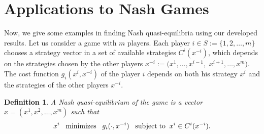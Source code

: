 \documentclass[11pt]{article}
\def\beq{\begin{equation}}
\def\eeq{\end{equation}}
\theoremstyle{plain}
\newtheorem{definition}{Definition}
\newtheorem{remark}{Remark}
\begin{document}
{%

\section{Applications to Nash Games} \label{sec5}
Now, we give some examples in finding Nash {{quasi-equilibria}} using our developed results.
 Let us consider a game with $m$ players. {{Each player $i\in S:=\{1,2,\ldots,m\}$ chooses a strategy vector in a set of available strategies $C^i(x^{-i})$, which depends on the strategies chosen by the other players $x^{-i}:=(x^1,\ldots,x^{i-1},$ $x^{i+1},\ldots,x^m )$.}} 
  The cost function $g_i(x^i,x^{-i})$ of {the} player $i$ depends   on both his strategy $x^i$ and the strategies of {the} other players $x^{-i}$.
\begin{definition}
A  Nash {{quasi-equilibrium}} of the game is a vector $x=(x^1,x^2,\ldots,x^m)$ such that
\beq\label{Nash}
x^i\; \;\;{\rm minimizes}\;\;\; g_i(\cdot,x^{-i})\;\;\;{\rm subject\;to}\;\;x^i\in C^i(x^{-i}).
\eeq
\end{definition}

}
\end{document}
